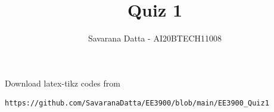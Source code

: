 \documentclass[journal,12pt,twocolumn]{IEEEtran}
\DeclareMathOperator*{\Res}{Res}
\begin{document}
\newcommand{\BEQA}{\begin{eqnarray}}
\newcommand{\EEQA}{\end{eqnarray}}
\newcommand{\define}{\stackrel{\triangle}{=}}

\raggedbottom
\setlength{\parindent}{0pt}
\providecommand{\mbf}{\mathbf}
\providecommand{\pr}[1]{\ensuremath{\Pr\left(#1\right)}}
\providecommand{\qfunc}[1]{\ensuremath{Q\left(#1\right)}}
\providecommand{\sbrak}[1]{\ensuremath{{}\left[#1\right]}}
\providecommand{\lsbrak}[1]{\ensuremath{{}\left[#1\right.}}
\providecommand{\rsbrak}[1]{\ensuremath{{}\left.#1\right]}}
\providecommand{\brak}[1]{\ensuremath{\left(#1\right)}}
\providecommand{\lbrak}[1]{\ensuremath{\left(#1\right.}}
\providecommand{\rbrak}[1]{\ensuremath{\left.#1\right)}}
\providecommand{\cbrak}[1]{\ensuremath{\left\{#1\right\}}}
\providecommand{\lcbrak}[1]{\ensuremath{\left\{#1\right.}}
\providecommand{\rcbrak}[1]{\ensuremath{\left.#1\right\}}}
\theoremstyle{remark}
\newtheorem{rem}{Remark}
\newcommand{\sgn}{\mathop{\mathrm{sgn}}}
\providecommand{\abs}[1]{\vert#1\vert}
\providecommand{\res}[1]{\Res\displaylimits_{#1}} 
\providecommand{\norm}[1]{\lVert#1\rVert}
\providecommand{\mtx}[1]{\mathbf{#1}}
\providecommand{\mean}[1]{E[ #1 ]}
\providecommand{\fourier}{\overset{\mathcal{F}}{ \rightleftharpoons}}
\providecommand{\system}{\overset{\mathcal{H}}{ \longleftrightarrow}}
\newcommand{\solution}{\noindent \textbf{Solution: }}
\newcommand{\cosec}{\,\text{cosec}\,}
\providecommand{\dec}[2]{\ensuremath{\overset{#1}{\underset{#2}{\gtrless}}}}
\newcommand{\myvec}[1]{\ensuremath{\begin{pmatrix}#1\end{pmatrix}}}
\newcommand{\mydet}[1]{\ensuremath{\begin{vmatrix}#1\end{vmatrix}}}

\makeatletter
{}
\makeatother
\let\StandardTheFigure\thefigure
\let\vec\mathbf
\renewcommand{\thefigure}{\theproblem}
\def\putbox#1#2#3{\makebox[0in][l]{\makebox[#1][l]{}\raisebox{\baselineskip}[0in][0in]{\raisebox{#2}[0in][0in]{#3}}}}
     \def\rightbox#1{\makebox[0in][r]{#1}}
     \def\centbox#1{\makebox[0in]{#1}}
     \def\topbox#1{\raisebox{-\baselineskip}[0in][0in]{#1}}
     \def\midbox#1{\raisebox{-0.5\baselineskip}[0in][0in]{#1}}
\vspace{3cm}
\title{Quiz 1}
\author{Savarana Datta - AI20BTECH11008}
\maketitle
\newpage
\bigskip
\renewcommand{\thefigure}{\theenumi}
\renewcommand{\thetable}{\theenumi}
Download latex-tikz codes from 
%
\begin{lstlisting}
https://github.com/SavaranaDatta/EE3900/blob/main/EE3900_Quiz1
\end{lstlisting}
\end{document}
